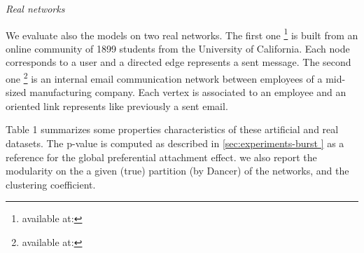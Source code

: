 \textit{Real networks}

We evaluate also the models on two  real networks.
The first one \footnote{available at:} is built from an online community of 1899 students from the University of California. Each node corresponds to a user and a    directed edge represents a sent message.
The second one \footnote{available at:} is an internal email communication network between employees of a mid-sized manufacturing company. Each vertex is associated  to an employee and an oriented link represents like previously a sent email.

Table 1 summarizes some properties characteristics of these artificial and real datasets. The  p-value is computed as described in \ref{sec:experiments-burst } as a reference for the global preferential attachment effect. we also report the modularity on the a given (true) partition (by Dancer) of the networks, and the clustering coefficient.

